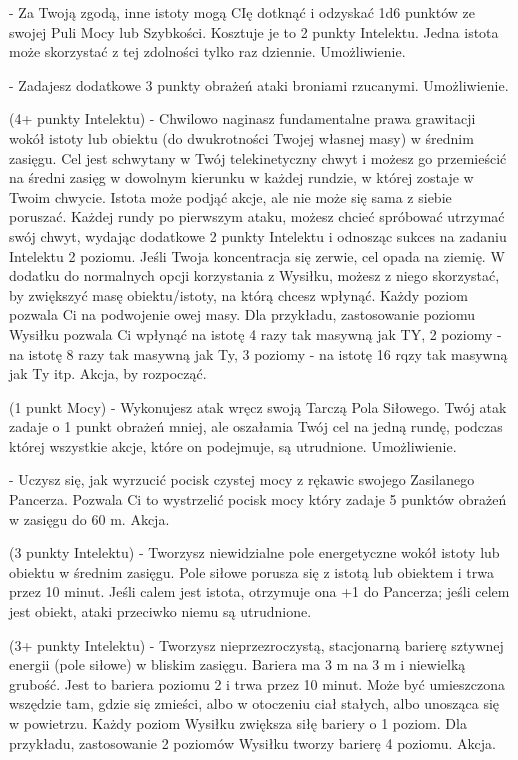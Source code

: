 { - Za Twoją zgodą, inne istoty mogą CIę dotknąć i odzyskać 1d6 punktów ze swojej Puli Mocy lub Szybkości. Kosztuje je to 2 punkty Intelektu. Jedna istota może skorzystać z tej zdolności tylko raz dziennie. Umożliwienie.

 - Zadajesz dodatkowe 3 punkty obrażeń ataki broniami rzucanymi. Umożliwienie.

 (4+ punkty Intelektu) - Chwilowo naginasz fundamentalne prawa grawitacji wokół istoty lub obiektu (do dwukrotności Twojej własnej masy) w średnim zasięgu. Cel jest schwytany w Twój telekinetyczny chwyt i możesz go przemieścić na średni zasięg w dowolnym kierunku w każdej rundzie, w której zostaje w Twoim chwycie. Istota może podjąć akcje, ale nie może się sama z siebie poruszać. Każdej rundy po pierwszym ataku, możesz chcieć spróbować utrzymać swój chwyt, wydając dodatkowe 2 punkty Intelektu i odnosząc sukces na zadaniu Intelektu 2 poziomu. Jeśli Twoja koncentracja się zerwie, cel opada na ziemię. W dodatku do normalnych opcji korzystania z Wysiłku, możesz z niego skorzystać, by zwiększyć masę obiektu/istoty, na którą chcesz wpłynąć. Każdy poziom pozwala Ci na podwojenie owej masy. Dla przykładu, zastosowanie poziomu Wysiłku pozwala Ci wpłynąć na istotę 4 razy tak masywną jak TY, 2 poziomy - na istotę 8 razy tak masywną jak Ty, 3 poziomy - na istotę 16 rqzy tak masywną jak Ty itp. Akcja, by rozpocząć.

 (1 punkt Mocy) - Wykonujesz atak wręcz swoją Tarczą Pola Siłowego. Twój atak zadaje o 1 punkt obrażeń mniej, ale oszałamia Twój cel na jedną rundę, podczas której wszystkie akcje, które on podejmuje, są utrudnione. Umożliwienie. 

 - Uczysz się, jak wyrzucić pocisk czystej mocy z rękawic swojego Zasilanego Pancerza. Pozwala Ci to wystrzelić pocisk mocy który zadaje 5 punktów obrażeń w zasięgu do 60 m. Akcja.

 (3 punkty Intelektu) - Tworzysz niewidzialne pole energetyczne wokół istoty lub obiektu w średnim zasięgu. Pole siłowe porusza się z istotą lub obiektem i trwa przez 10 minut. Jeśli calem jest istota, otrzymuje ona +1 do Pancerza; jeśli celem jest obiekt, ataki przeciwko niemu są utrudnione. 

 (3+ punkty Intelektu) - Tworzysz nieprzezroczystą, stacjonarną barierę sztywnej energii (pole siłowe) w bliskim zasięgu. Bariera ma 3 m na 3 m i niewielką grubość. Jest to bariera poziomu 2 i trwa przez 10 minut. Może być umieszczona wszędzie tam, gdzie się zmieści, albo w otoczeniu ciał stałych, albo unosząca się w powietrzu. Każdy poziom Wysiłku zwiększa siłę bariery o 1 poziom. Dla przykładu, zastosowanie 2 poziomów Wysiłku tworzy barierę 4 poziomu. Akcja.

}
